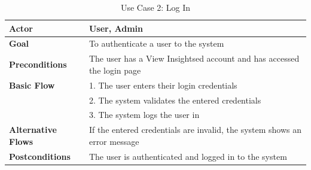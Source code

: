 \begin{table}[ht]
	\centering
	\begin{tabularx}{\textwidth}{|l|X|}
		\hline
		\textbf{Actor}             & User, Admin                                                               \\
		\hline
		\textbf{Goal}              & To authenticate a user to the system                                      \\
		\hline
		\textbf{Preconditions}     & The user has a View Insightsed account and has accessed the login page    \\
		\hline
		\textbf{Basic Flow}        & 1. The user enters their login credentials                                \\
		                           & 2. The system validates the entered credentials                           \\
		                           & 3. The system logs the user in                                            \\
		\hline
		\textbf{Alternative Flows} & If the entered credentials are invalid, the system shows an error message \\
		\hline
		\textbf{Postconditions}    & The user is authenticated and logged in to the system                     \\
		\hline
	\end{tabularx}
	\caption{Use Case 2: Log In}
	\label{tab:Use Case 2 Log In}
\end{table}